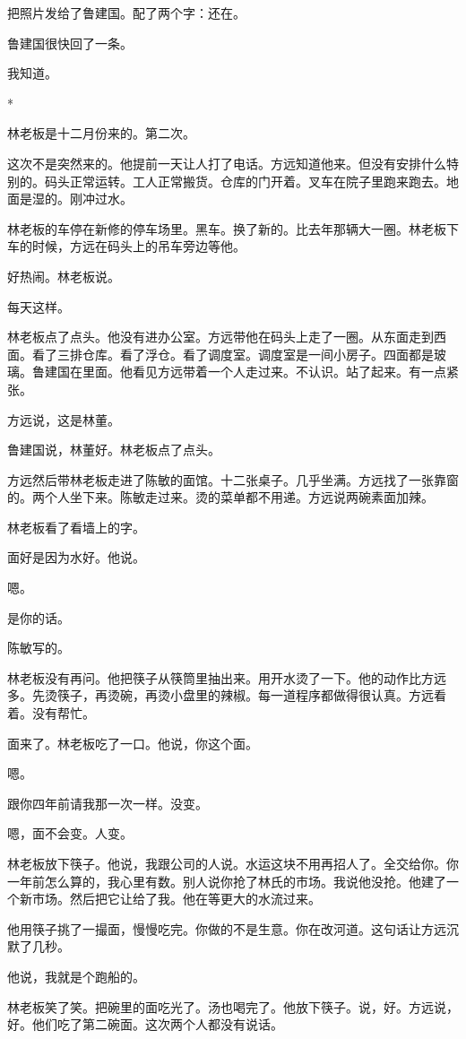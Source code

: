 \documentclass[UTF8,a5paper,11pt,openany]{ctexbook}
\newcommand{\scene}{\vspace{1em}\begin{center}*\quad*\quad*\end{center}\vspace{0.5em}}
\begin{document}
把照片发给了鲁建国。配了两个字：还在。

鲁建国很快回了一条。

我知道。


\scene

林老板是十二月份来的。第二次。

这次不是突然来的。他提前一天让人打了电话。方远知道他来。但没有安排什么特别的。码头正常运转。工人正常搬货。仓库的门开着。叉车在院子里跑来跑去。地面是湿的。刚冲过水。

林老板的车停在新修的停车场里。黑车。换了新的。比去年那辆大一圈。林老板下车的时候，方远在码头上的吊车旁边等他。

好热闹。林老板说。

每天这样。

林老板点了点头。他没有进办公室。方远带他在码头上走了一圈。从东面走到西面。看了三排仓库。看了浮仓。看了调度室。调度室是一间小房子。四面都是玻璃。鲁建国在里面。他看见方远带着一个人走过来。不认识。站了起来。有一点紧张。

方远说，这是林董。

鲁建国说，林董好。林老板点了点头。

方远然后带林老板走进了陈敏的面馆。十二张桌子。几乎坐满。方远找了一张靠窗的。两个人坐下来。陈敏走过来。烫的菜单都不用递。方远说两碗素面加辣。

林老板看了看墙上的字。

面好是因为水好。他说。

嗯。

是你的话。

陈敏写的。

林老板没有再问。他把筷子从筷筒里抽出来。用开水烫了一下。他的动作比方远多。先烫筷子，再烫碗，再烫小盘里的辣椒。每一道程序都做得很认真。方远看着。没有帮忙。

面来了。林老板吃了一口。他说，你这个面。

嗯。

跟你四年前请我那一次一样。没变。

嗯，面不会变。人变。

林老板放下筷子。他说，我跟公司的人说。水运这块不用再招人了。全交给你。你一年前怎么算的，我心里有数。别人说你抢了林氏的市场。我说他没抢。他建了一个新市场。然后把它让给了我。他在等更大的水流过来。

他用筷子挑了一撮面，慢慢吃完。你做的不是生意。你在改河道。这句话让方远沉默了几秒。

他说，我就是个跑船的。

林老板笑了笑。把碗里的面吃光了。汤也喝完了。他放下筷子。说，好。方远说，好。他们吃了第二碗面。这次两个人都没有说话。
\end{document}
